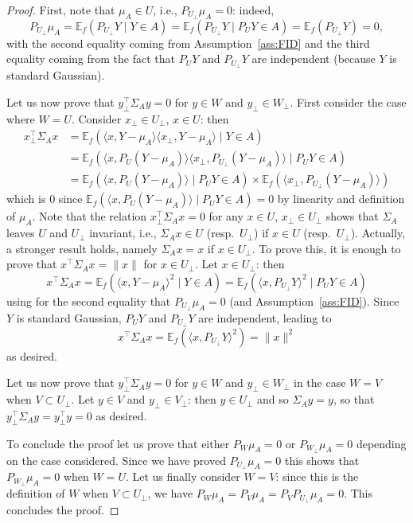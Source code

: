 \documentclass[10pt,a4paper]{amsart}
\newcommand{\E}{\mathbb{E}}
\begin{document}
\begin{proof}
	First, note that $\mu_A \in U$, i.e., $P_{U_\perp} \mu_A = 0$: indeed,
	\[ P_{U_\perp} \mu_A = \E_f(P_{U_\perp} Y \mid Y \in A) = \E_f(P_{U_\perp} Y \mid P_U Y \in A) = \E_f(P_{U_\perp} Y) = 0, \]
	with the second equality coming from Assumption~\ref{ass:FID} and the third equality coming from the fact that $P_U Y$ and $P_{U_\perp} Y$ are independent (because $Y$ is standard Gaussian).
	
	Let us now prove that $y_\perp^\top \Sigma_A y = 0$ for $y \in W$ and $y_\perp \in W_\perp$. First consider the case where $W = U$. Consider $x_\perp \in U_\perp$, $x \in U$: then
	\begin{align*}
		x_\perp^\top \Sigma_A x & = \E_f ( \langle x, Y - \mu_A \rangle \langle x_\perp, Y - \mu_A \rangle \mid Y \in A)\\
		& = \E_f ( \langle x, P_U (Y - \mu_A) \rangle \langle x_\perp, P_{U_\perp} (Y - \mu_A) \rangle \mid P_U Y \in A)\\
		& = \E_f ( \langle x, P_U (Y - \mu_A) \rangle \mid P_U Y \in A) \times \E_f ( \langle x_\perp, P_{U_\perp} (Y - \mu_A) \rangle)
	\end{align*}
	which is $0$ since $\E_f ( \langle x, P_U (Y - \mu_A) \rangle \mid P_U Y \in A) = 0$ by linearity and definition of $\mu_A$. Note that the relation $x^\top_\perp \Sigma_A x = 0$ for any $x \in U$, $x_\perp \in U_\perp$ shows that $\Sigma_A$ leaves $U$ and $U_\perp$ invariant, i.e., $\Sigma_A x \in U$ (resp.\ $U_\perp$) if $x \in U$ (resp.\ $U_\perp$). Actually, a stronger result holds, namely $\Sigma_A x = x$ if $x \in U_\perp$. To prove this, it is enough to prove that $x^\top \Sigma_A x = \lVert x \rVert$ for $x \in U_\perp$. Let $x \in U_\perp$: then
	\[ x^\top \Sigma_A x = \E_f \left( \langle x, Y - \mu_A \rangle^2 \mid Y \in A \right) = \E_f \left( \langle x, P_{U_\perp} Y \rangle^2 \mid P_U Y \in A \right) \]
	using for the second equality that $P_{U_\perp} \mu_A = 0$ (and Assumption~\ref{ass:FID}). Since $Y$ is standard Gaussian, $P_U Y$ and $P_{U_\perp} Y$ are independent, leading to
	\[ x^\top \Sigma_A x = \E_f \left( \langle x, P_{U_\perp} Y \rangle^2 \right) = \lVert x \rVert^2 \]
	as desired.
	
	Let us now prove that $y_\perp^\top \Sigma_A y = 0$ for $y \in W$ and $y_\perp \in W_\perp$ in the case $W = V$ when $V \subset U_\perp$. Let $y \in V$ and $y_\perp \in V_\perp$: then $y \in U_\perp$ and so $\Sigma_A y = y$, so that $y^\top_\perp \Sigma_A y = y^\top_\perp y = 0$ as desired.
	
	To conclude the proof let us prove that either $P_W \mu_A = 0$ or $P_{W_\perp} \mu_A = 0$ depending on the case considered. Since we have proved $P_{U_\perp} \mu_A = 0$ this shows that $P_{W_\perp} \mu_A = 0$ when $W = U$. Let us finally consider $W = V$: since this is the definition of $W$ when $V \subset U_\perp$, we have $P_W \mu_A = P_V \mu_A = P_V P_{U_\perp} \mu_A = 0$. This concludes the proof.
\end{proof}
\end{document}
